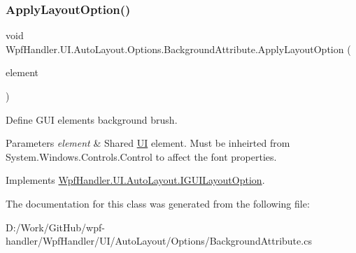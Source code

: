 \subsubsection{\texorpdfstring{Apply\+Layout\+Option()}{ApplyLayoutOption()}}
{\footnotesize\ttfamily void Wpf\+Handler.\+U\+I.\+Auto\+Layout.\+Options.\+Background\+Attribute.\+Apply\+Layout\+Option (\begin{DoxyParamCaption}\item[{Framework\+Element}]{element }\end{DoxyParamCaption})}



Define G\+UI element\textquotesingle{}s background brush. 


\begin{DoxyParams}{Parameters}
{\em element} & Shared \mbox{\hyperlink{namespace_wpf_handler_1_1_u_i}{UI}} element. Must be inheirted from {\ttfamily System.\+Windows.\+Controls.\+Control} to affect the font properties. \\
\hline
\end{DoxyParams}


Implements \mbox{\hyperlink{interface_wpf_handler_1_1_u_i_1_1_auto_layout_1_1_i_g_u_i_layout_option_ac2d2fa8aeaf753b3248381399f991005}{Wpf\+Handler.\+U\+I.\+Auto\+Layout.\+I\+G\+U\+I\+Layout\+Option}}.



The documentation for this class was generated from the following file\+:\begin{DoxyCompactItemize}
\item 
D\+:/\+Work/\+Git\+Hub/wpf-\/handler/\+Wpf\+Handler/\+U\+I/\+Auto\+Layout/\+Options/Background\+Attribute.\+cs\end{DoxyCompactItemize}
